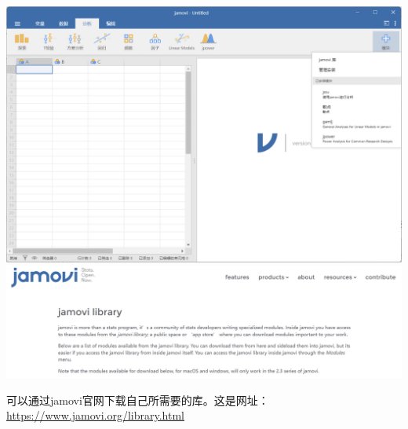 \documentclass[]{ctexbook}
\theoremstyle{definition}
\theoremstyle{definition}
\theoremstyle{definition}
\theoremstyle{definition}
\theoremstyle{remark}
\begin{document}
\includegraphics{img/jamovi/modules.png}\\
\includegraphics{img/jamovi/modules-library.png}

可以通过jamovi官网下载自己所需要的库。这是网址：\url{https://www.jamovi.org/library.html}
\end{document}
